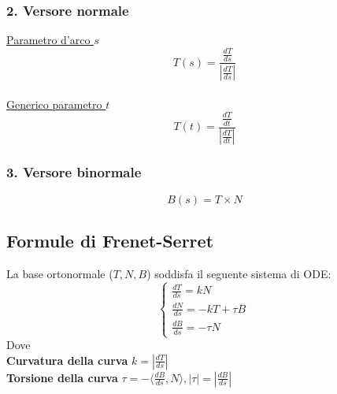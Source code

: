 \documentclass{article} %
\begin{document}
    \subsubsection*{ 2. Versore normale}
    \underline{Parametro d'arco $s$} $$T(s)=\frac{ \frac{dT}{ds}}{ \left| \frac{dT}{ds} \right|} $$ \\ \underline{Generico parametro $t$} $$T(t)=\frac{ \frac{dT}{dt}}{ \left| \frac{dT}{dt} \right|}$$

    \subsubsection*{ 3. Versore binormale}
    $$ B(s) = T \times N $$

    \subsection*{Formule di Frenet-Serret}
    La base ortonormale ($T, N, B$) soddisfa il seguente sistema di ODE:
    \begin{equation}
        \begin{cases}
            \frac{dT}{ds} = k N \\
            \frac{dN}{ds} = -kT + \tau B \\
            \frac{dB}{ds} = - \tau N
        \end{cases}\,
    \end{equation}
    Dove \\ \textbf{Curvatura della curva} $k = \left| \frac{dT}{ds} \right| $ \\ \textbf{Torsione della curva} $ \tau = - \langle \frac{dB}{ds} , N \rangle , | \tau | = | \frac{dB}{ds} |  $
    
\end{document}
